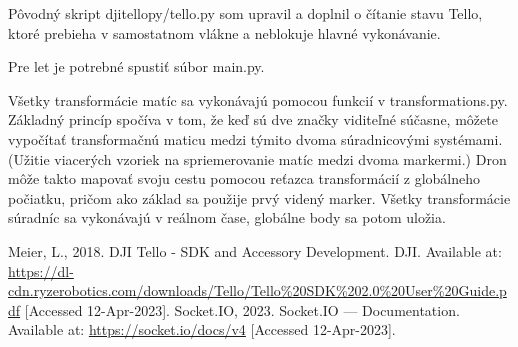 \documentclass[a4paper]{feidipsp}
\begin{document}
Pôvodný skript djitellopy/tello.py som upravil a doplnil o čítanie stavu Tello, ktoré prebieha v samostatnom vlákne a neblokuje hlavné vykonávanie.

Pre let je potrebné spustiť súbor main.py.

Všetky transformácie matíc sa vykonávajú pomocou funkcií v transformations.py. Základný princíp spočíva v tom, že keď sú dve značky viditeľné súčasne, môžete vypočítať transformačnú maticu medzi týmito dvoma súradnicovými systémami. (Užitie viacerých vzoriek na spriemerovanie matíc medzi dvoma markermi.) Dron môže takto mapovať svoju cestu pomocou reťazca transformácií z globálneho počiatku, pričom ako základ sa použije prvý videný marker. Všetky transformácie súradníc sa vykonávajú v reálnom čase, globálne body sa potom uložia.

\newpage
\begin{flushleft}

\def\refname{Zoznam použitej literatúry}

\begin{thebibliography}{999}
     Meier, L., 2018. DJI Tello - SDK and Accessory Development. DJI. Available at: \url{https://dl-cdn.ryzerobotics.com/downloads/Tello/Tello\%20SDK\%202.0\%20User\%20Guide.pdf} [Accessed 12-Apr-2023].
     Socket.IO, 2023. Socket.IO — Documentation. Available at: \url{https://socket.io/docs/v4} [Accessed 12-Apr-2023].
\end{thebibliography}

\end{flushleft}








 
\end{document}
